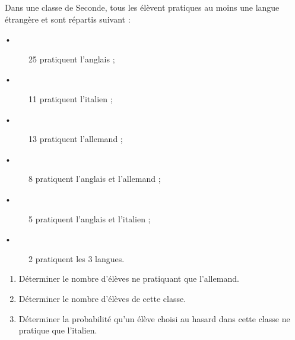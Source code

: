 
Dans une classe de Seconde, tous les élèvent pratiques au moins une langue étrangère et
sont répartis suivant :
\begin{description}
\item[•] 25 pratiquent l'anglais ;
\item[•]  11 pratiquent l'italien ;
\item[•]  13 pratiquent l'allemand ;
\item[•]  8 pratiquent l'anglais et l'allemand ;
\item[•]  5 pratiquent l'anglais et l'italien ;
\item[•]  2 pratiquent les 3 langues.
\end{description}
\begin{enumerate}
\item Déterminer le nombre d'élèves ne pratiquant que l'allemand.
\item Déterminer le nombre d'élèves de cette classe.
\item Déterminer la probabilité qu'un élève choisi au hasard dans cette classe ne pratique que l'italien.
\end{enumerate}